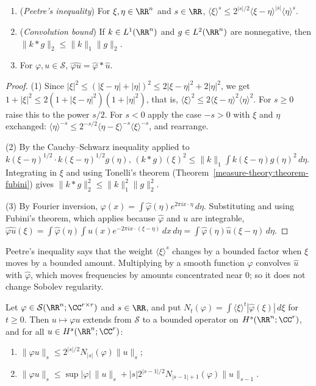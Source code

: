 \begin{lemma}\label{distributions:lemma-peetre}
\begin{enumerate}
\item (\emph{Peetre's inequality}) For $\xi, \eta \in \RR^n$ and $s \in \RR$, $\langle\xi\rangle^s \leq 2^{|s|/2}\langle\xi - \eta\rangle^{|s|}\langle\eta\rangle^s$.
\item (\emph{Convolution bound}) If $k \in L^1(\RR^n)$ and $g \in L^2(\RR^n)$ are nonnegative, then $\|k * g\|_2 \leq \|k\|_1\|g\|_2$.
\item For $\varphi, u \in \mathcal{S}$, $\widehat{\varphi u} = \hat\varphi * \hat u$.
\end{enumerate}
\end{lemma}

\begin{proof}
(1) Since $|\xi|^2 \leq (|\xi - \eta| + |\eta|)^2 \leq 2|\xi - \eta|^2 + 2|\eta|^2$, we get $1 + |\xi|^2 \leq 2(1 + |\xi - \eta|^2)(1 + |\eta|^2)$, that is,
$\langle\xi\rangle^2 \leq 2\langle\xi - \eta\rangle^2\langle\eta\rangle^2$. For $s \geq 0$ raise this to the power $s/2$. For $s < 0$ apply the case $-s > 0$ with $\xi$ and $\eta$ exchanged:
$\langle\eta\rangle^{-s} \leq 2^{-s/2}\langle\eta - \xi\rangle^{-s}\langle\xi\rangle^{-s}$, and rearrange.

(2) By the Cauchy--Schwarz inequality applied to $k(\xi - \eta)^{1/2} \cdot k(\xi - \eta)^{1/2}g(\eta)$,
$(k * g)(\xi)^2 \leq \|k\|_1\int k(\xi - \eta)g(\eta)^2\,d\eta$. Integrating in $\xi$ and using Tonelli's theorem (Theorem~\ref{measure-theory:theorem-fubini}) gives $\|k * g\|_2^2 \leq \|k\|_1^2\|g\|_2^2$.

(3) By Fourier inversion, $\varphi(x) = \int\hat\varphi(\eta)e^{2\pi ix\cdot\eta}\,d\eta$. Substituting and using Fubini's theorem, which applies because $\hat\varphi$ and $u$ are integrable,
$\widehat{\varphi u}(\xi) = \int\hat\varphi(\eta)\int u(x)e^{-2\pi ix\cdot(\xi - \eta)}\,dx\,d\eta = \int\hat\varphi(\eta)\hat u(\xi - \eta)\,d\eta$.
\end{proof}

Peetre's inequality says that the weight $\langle\xi\rangle^s$ changes by a bounded factor when $\xi$ moves by a bounded amount. Multiplying by a smooth function $\varphi$ convolves $\hat u$ with $\hat\varphi$, which
moves frequencies by amounts concentrated near $0$; so it does not change Sobolev regularity.

\begin{proposition}\label{distributions:proposition-multiplication}
Let $\varphi \in \mathcal{S}(\RR^n; \CC^{r \times r})$ and $s \in \RR$, and put $N_t(\varphi) = \int\langle\xi\rangle^{t}|\hat\varphi(\xi)|\,d\xi$ for $t \geq 0$. Then $u \mapsto \varphi u$ extends from $\mathcal{S}$ to a bounded
operator on $H^s(\RR^n; \CC^r)$, and for all $u \in H^s(\RR^n; \CC^r)$:
\begin{enumerate}
\item $\|\varphi u\|_s \leq 2^{|s|/2}N_{|s|}(\varphi)\|u\|_s$;
\item $\|\varphi u\|_s \leq \sup|\varphi|\,\|u\|_s + |s|2^{|s-1|/2}N_{|s-1|+1}(\varphi)\|u\|_{s-1}$.
\end{enumerate}
\end{proposition}


